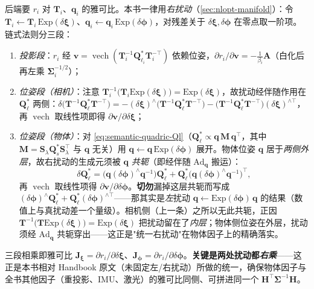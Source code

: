 \begin{derivation}[物体因子对相机位姿与物体位姿的右扰动雅可比]
后端要 $r_i$ 对 $\mathbf{T}_i$、$\mathbf{q}_i$ 的雅可比。本书一律用\emph{右扰动}（\cref{sec:nlopt-manifold}）：令 $\mathbf{T}_i\leftarrow\mathbf{T}_i\,\mathrm{Exp}(\delta\boldsymbol\xi)$、$\mathbf{q}_i\leftarrow\mathbf{q}_i\,\mathrm{Exp}(\delta\boldsymbol\phi)$，对残差关于 $\delta\boldsymbol\xi,\delta\boldsymbol\phi$ 在零点取一阶项。链式法则分三段：
\begin{enumerate}
  \item \emph{投影段}：$r_i$ 经 $\mathbf{v}=\operatorname{vech}(\mathbf{T}_i^{-1}\mathbf{Q}_{\ell_i}^{*}\mathbf{T}_i^{-\top})$ 依赖位姿，$\partial r_i/\partial\mathbf{v}=-\tfrac1{\beta_i}\mathbf{A}$（白化后再左乘 $\boldsymbol\Sigma_i^{-1/2}$）；
  \item \emph{位姿段（相机）}：注意 $\mathbf{T}_i^{-1}\!\big(\mathbf{T}_i\mathrm{Exp}(\delta\boldsymbol\xi)\big)=\mathrm{Exp}(\delta\boldsymbol\xi)$，故扰动经伴随作用在 $\mathbf{Q}_\ell^{*}$ 两侧：$\delta\big(\mathbf{T}^{-1}\mathbf{Q}_\ell^{*}\mathbf{T}^{-\top}\big)=-(\delta\boldsymbol\xi)^\wedge\big(\mathbf{T}^{-1}\mathbf{Q}_\ell^{*}\mathbf{T}^{-\top}\big)-\big(\mathbf{T}^{-1}\mathbf{Q}_\ell^{*}\mathbf{T}^{-\top}\big)(\delta\boldsymbol\xi)^{\wedge\top}$，再 $\operatorname{vech}$ 取线性项即得 $\partial\mathbf{v}/\partial\delta\boldsymbol\xi$；
  \item \emph{位姿段（物体）}：对 \cref{eq:semantic-quadric-Ql}（$\mathbf{Q}_\ell^{*}\propto\mathbf{q}\,\mathbf{M}\,\mathbf{q}^\top$，其中 $\mathbf{M}=\mathbf{S}_\lambda\mathbf{Q}_s^{*}\mathbf{S}_\lambda^\top$ 与 $\mathbf{q}$ 无关）用 $\mathbf{q}\leftarrow\mathbf{q}\,\mathrm{Exp}(\delta\boldsymbol\phi)$ 展开。物体位姿 $\mathbf{q}$ 居于\emph{两侧外层}，故右扰动的生成元须被 $\mathbf{q}$ \emph{共轭}（即经伴随 $\mathrm{Ad}_{\mathbf{q}}$ 搬运）：
  \[
    \delta\mathbf{Q}_\ell^{*}=\big(\mathbf{q}(\delta\boldsymbol\phi)^\wedge\mathbf{q}^{-1}\big)\mathbf{Q}_\ell^{*}+\mathbf{Q}_\ell^{*}\big(\mathbf{q}(\delta\boldsymbol\phi)^\wedge\mathbf{q}^{-1}\big)^{\!\top},
  \]
  再 $\operatorname{vech}$ 取线性项得 $\partial\mathbf{v}/\partial\delta\boldsymbol\phi$。\textbf{切勿}漏掉这层共轭而写成 $(\delta\boldsymbol\phi)^\wedge\mathbf{Q}_\ell^{*}+\mathbf{Q}_\ell^{*}(\delta\boldsymbol\phi)^{\wedge\top}$——那其实是\emph{左}扰动 $\mathbf{q}\leftarrow\mathrm{Exp}(\delta\boldsymbol\phi)\,\mathbf{q}$ 的结果（数值上与真扰动差一个量级）。相机侧（上一条）之所以无此共轭，正因 $\mathbf{T}^{-1}\!\big(\mathbf{T}\mathrm{Exp}(\delta\boldsymbol\xi)\big)=\mathrm{Exp}(\delta\boldsymbol\xi)$ 把扰动留在了\emph{内层}；物体侧位姿在外层，扰动须经 $\mathrm{Ad}_{\mathbf{q}}$ 共轭穿出——这正是"统一右扰动"在物体因子上的精确落实。
\end{enumerate}
三段相乘即雅可比 $\mathbf{J}_{\boldsymbol\xi}=\partial r_i/\partial\delta\boldsymbol\xi$、$\mathbf{J}_{\boldsymbol\phi}=\partial r_i/\partial\delta\boldsymbol\phi$。\textbf{关键是两处扰动都\emph{右乘}}——这正是本书相对 Handbook 原文（未固定左/右扰动）所做的统一，确保物体因子与全书其他因子（重投影、IMU、激光）的雅可比同侧、可拼进同一个 $\mathbf{H}^\top\boldsymbol\Sigma^{-1}\mathbf{H}$。
\end{derivation}

